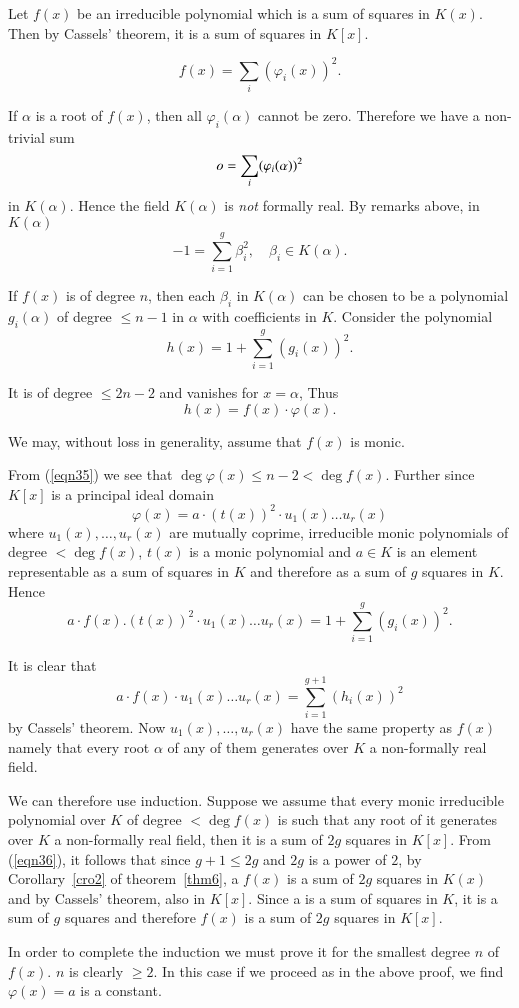 \begin{Proof}
Let $f(x)$ be an irreducible polynomial which is a sum of squares in
$K(x)$. Then by Cassels' theorem, it is a sum of squares in $K[x]$.

\begin{equation}\label{eqn34}
f(x)=\sum\limits_{i}(\varphi_i(x))^{2}.
\end{equation}

If $\alpha$ is a root of $f(x)$, then all $\varphi_i(\alpha)$ cannot
be zero. Therefore we have a non-trivial sum 
$$
o=\sum\limits_{i}(\varphi_i(\alpha))^{2}
$$
in $K(\alpha)$. Hence the field $K(\alpha)$ is \textit{not} formally
real. By remarks above, in $K(\alpha)$
$$
-1=\sum\limits_{i=1}^{g}\beta_i^{2},\quad \beta_i\in K(\alpha).
$$

If $f(x)$ is of degree $n$, then each $\beta_i$ in $K(\alpha)$ can be
chosen to be a polynomial $g_i(\alpha)$ of degree $\leq n-1$ in
$\alpha$ with coefficients in $K$. Consider the polynomial
$$
h(x)=1+\sum\limits_{i=1}^{g}(g_i(x))^{2}.
$$

It is of degree $\leq 2n-2$ and vanishes for $x=\alpha$, Thus 
\begin{equation}\label{eqn35}
h(x)=f(x)\cdot\varphi(x).
\end{equation}

We may, without loss in generality, assume that $f(x)$ is monic.

From (\ref{eqn35}) we see that $\deg \varphi(x)\leq n-2<\deg
f(x)$. Further since $K[x]$ is a principal ideal domain
$$
\varphi(x)=a\cdot(t(x))^{2}\cdot u_1(x)\ldots u_r(x)
$$
where $u_1(x),\ldots,u_r(x)$ are mutually coprime, irreducible monic
polynomials of degree $< \deg f(x)$, $t(x)$ is a monic polynomial and
$a\in K$ is an element representable as a sum of squares in $K$ and
therefore as a sum of $g$ squares in $K$. Hence 
$$
a\cdot f(x).(t(x))^{2}\cdot u_1(x)\ldots
u_r(x)=1+\sum\limits_{i=1}^{g} (g_i(x))^{2}.
$$

It is clear that 
\begin{equation}\label{eqn36}
a\cdot f(x)\cdot u_1(x)\ldots u_r(x)=\sum\limits_{i=1}^{g+1}(h_i(x))^{2}
\end{equation}
by Cassels' theorem. Now $u_1(x),\ldots,u_r(x)$ have the same property
as $f(x)$ namely that every root $\alpha$ of any of them generates
over $K$ a non-formally real field.

We can therefore use induction. Suppose we assume that every monic
irreducible polynomial over $K$ of degree $<\deg f(x)$ is such that
any root of it generates over $K$ a non-formally real field, then it
is a sum of $2g$ squares in $K[x]$. From (\ref{eqn36}), it follows
that since $g+1\leq 2g$ and $2g$ is a power of $2$, by Corollary~\ref{cro2} of theorem~\ref{thm6}, a $f(x)$ is a sum of $2g$ squares in
$K(x)$ and by Cassels' theorem, also in $K[x]$. Since a is a sum of
squares in $K$, it is a sum of $g$ squares and therefore $f(x)$ is a
sum of $2g$ squares in $K[x]$. 

In order to complete the induction we must prove it for the smallest
degree $n$ of $f(x)$. $n$ is clearly $\geq 2$. In this case if we
proceed as in the above proof, we find $\varphi(x)=a$ is a constant.
\enprf
\end{Proof}

